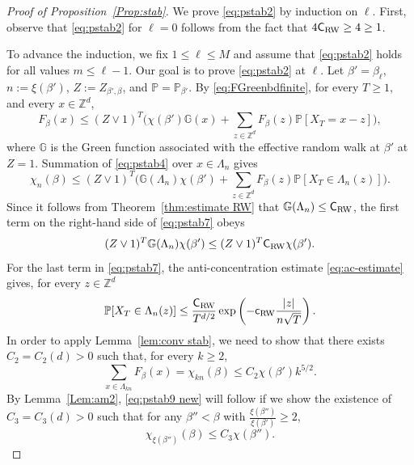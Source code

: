 \documentclass[11pt,a4paper]{article}
\numberwithin{equation}{section}
\theoremstyle{plain}
\theoremstyle{definition}
\newcommand\1{\mathds{1}}
\newcommand\Crw{\mathsf{C}_{\textup{RW}}}
\newcommand\crw{\mathsf{c}_{\textup{RW}}}
\begin{document}
\begin{proof}[Proof of Proposition~\textup{\ref{Prop:stab}}]
We prove \eqref{eq:pstab2} by induction on $\ell$. First, observe that \eqref{eq:pstab2} for $\ell=0$ follows from the
fact that $4\Crw \ge 4 \ge 1$.

To advance the induction, we fix $1\leq \ell\leq M$ and assume that \eqref{eq:pstab2} holds for all values $m\leq \ell-1$. Our goal is to prove \eqref{eq:pstab2} at $\ell$. Let $\beta'=\beta_\ell$, $n:=\xi(\beta')$, $Z:=Z_{\beta',\beta}$, and $\mathbb P=\mathbb P_{\beta'}$. By \eqref{eq:FGreenbdfinite}, for every $T\geq 1$, and every $x\in \mathbb Z^d$,
\begin{equation}\label{eq:pstab4}
	F_\beta(x)\leq (Z\vee 1)^T\Big(\chi(\beta')\mathbb G(x)+\sum_{z\in \mathbb Z^d}F_\beta(z)\mathbb P[X_T=x-z]\Big),
\end{equation}
where $\mathbb G$ is the Green function associated with the effective random walk at $\beta'$ at $Z=1$.
Summation of \eqref{eq:pstab4} over $x\in \Lambda_n$ gives
\begin{equation}\label{eq:pstab7}
	\chi_n(\beta)\leq (Z\vee 1)^T\bigg(\mathbb G(\Lambda_n)\chi(\beta')+\sum_{z\in \mathbb Z^d}F_\beta(z)\mathbb P[X_T\in \Lambda_n(z)]\bigg).
\end{equation}
Since it follows from Theorem~\ref{thm:estimate RW} that
$\mathbb G(\Lambda_n)\leq \Crw$, the first term on the right-hand side
of \eqref{eq:pstab7} obeys
\begin{equation}\label{eq:pstab7.5}
	(Z\vee 1)^T \mathbb G(\Lambda_n)\chi(\beta')
    \le
   (Z\vee 1)^T  \Crw \chi(\beta').
\end{equation}
For the last term in \eqref{eq:pstab7}, the anti-concentration estimate \eqref{eq:ac-estimate} gives, for every $z\in \mathbb Z^d$
\begin{equation}\label{eq:pstab8}
	\mathbb P[X_T\in \Lambda_n(z)]\leq \frac{\Crw}{T^{d/2}}\exp\left(-\crw\frac{|z|}{n\sqrt{T}}\right).
\end{equation}
In order to apply Lemma~\ref{lem:conv stab},
we need to show that there exists $C_2=C_2(d)>0$ such that, for every $k\geq 2$,
\begin{equation}\label{eq:pstab9 new}
	\sum_{x\in \Lambda_{kn}}F_\beta(x)=\chi_{kn}(\beta)\leq C_2 \chi(\beta') k^{5/2}.
\end{equation}
By Lemma~\ref{Lem:am2}, \eqref{eq:pstab9 new} will follow if we show the existence of $C_3=C_3(d)>0$ such that for any $\beta''<\beta$ with $\tfrac{\xi(\beta'')}{\xi(\beta')}\geq 2$,
\begin{equation}\label{eq:pstab10 new}
	\chi_{\xi(\beta'')}(\beta)\leq C_3\chi(\beta'').

\end{equation}
\end{proof}
\end{document}

